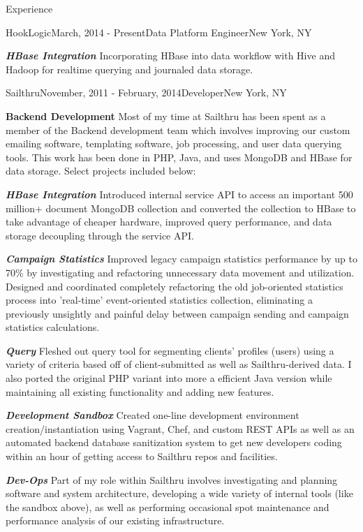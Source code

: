 \documentclass{resume} %
\begin{document}
\begin{rSection}{Experience}

    \begin{rSubsection}{HookLogic}{March, 2014 - Present}{Data Platform Engineer}{New York, NY}
    \item \textbf{\textit{HBase Integration}} Incorporating HBase into data workflow with Hive and Hadoop for realtime querying and journaled data storage.
    \end{rSubsection}

    \begin{rSubsection}{Sailthru}{November, 2011 - February, 2014}{Developer}{New York, NY}
    \item \textbf{Backend Development} Most of my time at Sailthru has been spent as a member of the Backend development team which involves improving our custom emailing software, templating software, job processing, and user data querying tools.  This work has been done in PHP, Java, and uses MongoDB and HBase for data storage.  Select projects included below:
    \item \textbf{\textit{HBase Integration}} Introduced internal service API to access an important 500 million+ document MongoDB collection and converted the collection to HBase to take advantage of cheaper hardware, improved query performance, and data storage decoupling through the service API.
    \item \textbf{\textit{Campaign Statistics}} Improved legacy campaign statistics performance by up to 70\% by investigating and refactoring unnecessary data movement and utilization. Designed and coordinated completely refactoring the old job-oriented statistics process into 'real-time' event-oriented statistics collection, eliminating a previously unsightly and painful delay between campaign sending and campaign statistics calculations.
    \item \textbf{\textit{Query}} Fleshed out query tool for segmenting clients' profiles (users) using a variety of criteria based off of client-submitted as well as Sailthru-derived data. I also ported the original PHP variant into more a efficient Java version while maintaining all existing functionality and adding new features.
    \item \textbf{\textit{Development Sandbox}} Created one-line development environment creation/instantiation using Vagrant, Chef, and custom REST APIs as well as an automated backend database sanitization system to get new developers coding within an hour of getting access to Sailthru repos and facilities.
    \item \textbf{\textit{Dev-Ops}} Part of my role within Sailthru involves investigating and planning software and system architecture, developing a wide variety of internal tools (like the sandbox above), as well as performing occasional spot maintenance and performance analysis of our existing infrastructure.
    \end{rSubsection}


\end{rSection}
\end{document}
